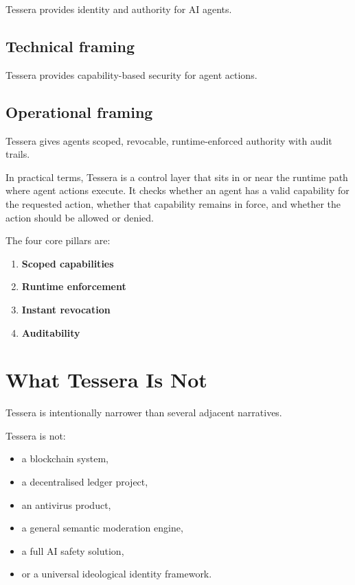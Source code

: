\documentclass[11pt, a4paper]{article}
\begin{document}
Tessera provides identity and authority for AI agents.

\subsection{Technical framing}

Tessera provides capability-based security for agent actions.

\subsection{Operational framing}

Tessera gives agents scoped, revocable, runtime-enforced authority with audit trails.

In practical terms, Tessera is a control layer that sits in or near the runtime path where agent actions execute. It checks whether an agent has a valid capability for the requested action, whether that capability remains in force, and whether the action should be allowed or denied.

The four core pillars are:

\begin{enumerate}
  \item \textbf{Scoped capabilities}
  \item \textbf{Runtime enforcement}
  \item \textbf{Instant revocation}
  \item \textbf{Auditability}
\end{enumerate}

\section{What Tessera Is Not}

Tessera is intentionally narrower than several adjacent narratives.

Tessera is not:

\begin{itemize}
  \item a blockchain system,
  \item a decentralised ledger project,
  \item an antivirus product,
  \item a general semantic moderation engine,
  \item a full AI safety solution,
  \item or a universal ideological identity framework.
\end{itemize}
\end{document}
